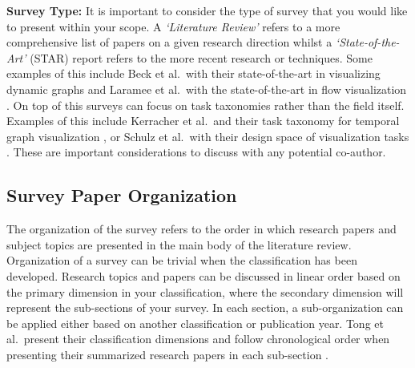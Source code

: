 \textbf{Survey Type:} It is important to consider the type of survey that you would like to present within your scope. A \textit{`Literature Review'} refers to a more comprehensive list of papers on a given research direction whilst a \textit{`State-of-the-Art'} (STAR) report refers to the more recent research or techniques. Some examples of this include  Beck et al.\ with their state-of-the-art in visualizing dynamic graphs \cite{beck2014state} and Laramee et al.\ with the state-of-the-art in flow visualization \cite{laramee2004state}. On top of this surveys can focus on task taxonomies rather than the field itself. Examples of this include Kerracher et al.\ and their task taxonomy for temporal graph visualization \cite{kerracher2015task}, or Schulz et al.\ with their design space of visualization tasks \cite{schulz2013design}. These are important considerations to discuss with any potential co-author.

\subsection{Survey Paper Organization}
The organization of the survey refers to the order in which research papers and subject topics are presented in the main body of the literature review. Organization of a survey can be trivial when the classification has been developed. Research topics and papers can be discussed in linear order based on the primary dimension in your classification, where the secondary dimension will represent the sub-sections of your survey. In each section, a sub-organization can be applied either based on another classification or publication year. Tong et al.\  present their classification dimensions and follow chronological order when presenting their summarized research papers in each sub-section \cite{tong2018storytelling}. 

